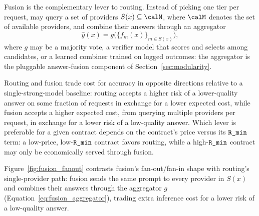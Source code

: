Fusion is the complementary lever to routing. Instead of picking one tier
per request, \NoesisServer{} may query a set of providers $S(x) \subseteq
\calM$, where $\calM$ denotes the set of available providers, and combine
their answers through an aggregator
\begin{equation}
  \label{eq:fusion_aggregator}
  \hat y(x) = g\big( \{ f_m(x) \}_{m \in S(x)} \big),
\end{equation}
where $g$ may be a majority vote, a verifier model that scores and selects
among candidates, or a learned combiner trained on logged outcomes: the
aggregator is the pluggable answer-fusion component of
Section~\ref{sec:modularity}.

Routing and fusion trade cost for accuracy in opposite directions relative
to a single-strong-model baseline: routing accepts a higher risk of a
lower-quality answer on some fraction of requests in exchange for a lower
expected cost, while fusion accepts a higher expected cost, from querying
multiple providers per request, in exchange for a lower risk of a
low-quality answer. Which lever is preferable for a given contract depends
on the contract's price versus its $\textnormal{\texttt{R\_min}}$ term: a low-price,
low-$\textnormal{\texttt{R\_min}}$ contract favors routing, while a high-$\textnormal{\texttt{R\_min}}$ contract
may only be economically served through fusion.

Figure~\ref{fig:fusion_fanout} contrasts fusion's fan-out/fan-in shape
with routing's single-provider path: fusion sends the same prompt to
every provider in $S(x)$ and combines their answers through the
aggregator $g$ (Equation~\eqref{eq:fusion_aggregator}), trading extra
inference cost for a lower risk of a low-quality answer.

